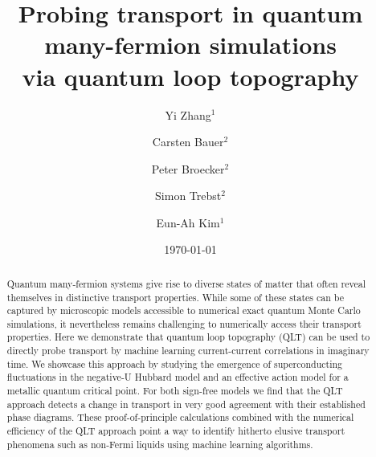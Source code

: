 \documentclass[amsmath,amssymb, aps, prl, twocolumn]{revtex4-1}
\begin{document}
\title{ Probing transport in quantum many-fermion simulations\\ via quantum loop topography}

\author{Yi Zhang$^1$}
\author{Carsten Bauer$^2$}
\author{Peter Broecker$^2$} 
\author{Simon Trebst$^2$}
\author{Eun-Ah Kim$^1$}

%

\date{\today}%

\begin{abstract}
Quantum many-fermion systems give rise to diverse states of matter that often reveal themselves in distinctive transport properties. While some of these states can be captured by microscopic models accessible to numerical exact quantum Monte Carlo simulations, it nevertheless remains challenging to  numerically access their transport properties. 
Here we demonstrate that quantum loop topography (QLT) can be used to directly probe transport by machine learning current-current correlations in imaginary time.
We showcase this approach by studying the emergence of superconducting fluctuations in the negative-U Hubbard model and  
an effective action model for a metallic %
quantum critical point. 
For both sign-free models we find that the QLT approach detects a change in transport in very good agreement with their established 
phase diagrams.
These proof-of-principle calculations combined with the numerical efficiency of the QLT approach point a way to identify hitherto elusive
transport phenomena such as non-Fermi liquids using machine learning algorithms.
\end{abstract}

\maketitle

\end{document}
